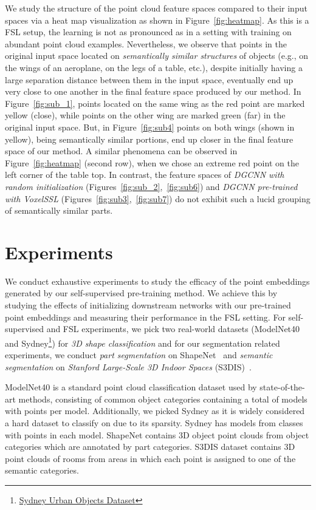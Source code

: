 \documentclass{article}
\begin{document}
We study the structure of the point cloud feature spaces compared to their input spaces via a 
heat map visualization as shown in Figure~\ref{fig:heatmap}.
As this is a FSL setup, the learning is not as pronounced as in a setting with training on abundant point cloud examples. Nevertheless, we observe that points in the original input space located on \emph{semantically similar structures} of objects (e.g., on the wings of an aeroplane, on the legs of a table, etc.), despite initially having a large separation distance between them in the input space, eventually end up very close to one another in the final feature space produced by our method. 
In Figure~\ref{fig:sub_1}, points located on the same wing as the red point are marked yellow (close), while points on the other wing are marked green (far) in the original input space. But, in Figure~\ref{fig:sub4} points on both wings (shown in yellow), being semantically similar portions, end up closer in the final feature space of our method. A similar phenomena can be observed in Figure~\ref{fig:heatmap} (second row), when we chose an extreme red point on the left corner of the table top. In contrast, the feature spaces of \emph{DGCNN with random initialization} (Figures~\ref{fig:sub_2},~\ref{fig:sub6}) and \emph{DGCNN pre-trained with VoxelSSL} (Figures~\ref{fig:sub3},~\ref{fig:sub7}) do not exhibit such a lucid grouping of semantically similar parts. 

\section{Experiments}
\label{others}
We conduct exhaustive experiments to study the efficacy of the point embeddings generated by our self-supervised pre-training method. We achieve this by studying the effects of initializing downstream networks with our pre-trained point embeddings and measuring their performance in the FSL setting.  
For self-supervised and FSL experiments, we pick two real-world datasets (ModelNet40~\cite{wu20153d} and Sydney\footnote{\href{http://www.acfr.usyd.edu.au/papers/SydneyUrbanObjectsDataset.shtml}{Sydney Urban Objects Dataset}}) for \emph{3D shape classification} and 
 for our segmentation related experiments, we conduct \emph{part segmentation} on ShapeNet~\cite{yi2016scalable} and \emph{semantic segmentation} on \emph{Stanford Large-Scale 3D Indoor Spaces} (S3DIS)~\cite{armeni20163d}.

 ModelNet40 is a standard point cloud classification dataset used by state-of-the-art methods, consisting of  common object categories containing a total of  models with  points per model. 
 Additionally, we picked Sydney as it is widely considered a hard dataset to classify on due to its sparsity. Sydney has  models from  classes with  points in each model. 
 ShapeNet contains  3D object point clouds from  object categories which are annotated by  part categories. S3DIS dataset contains 3D point clouds of  rooms from  areas in which each point is assigned to one of the  semantic categories. 
 
\end{document}
